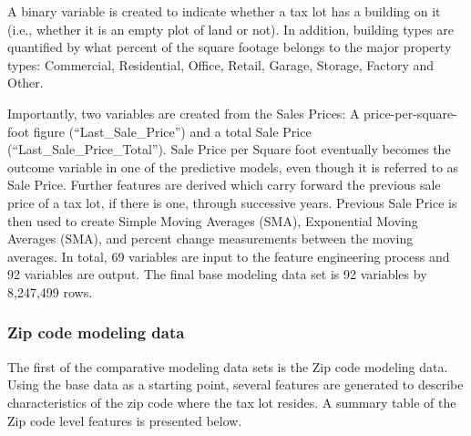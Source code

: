 \documentclass[]{article}
\begin{document}
A binary variable is created to indicate whether a tax lot has a
building on it (i.e., whether it is an empty plot of land or not). In
addition, building types are quantified by what percent of the square
footage belongs to the major property types: Commercial, Residential,
Office, Retail, Garage, Storage, Factory and Other.

Importantly, two variables are created from the Sales Prices: A
price-per-square-foot figure (``Last\_Sale\_Price'') and a total Sale
Price (``Last\_Sale\_Price\_Total''). Sale Price per Square foot
eventually becomes the outcome variable in one of the predictive models,
even though it is referred to as Sale Price. Further features are
derived which carry forward the previous sale price of a tax lot, if
there is one, through successive years. Previous Sale Price is then used
to create Simple Moving Averages (SMA), Exponential Moving Averages
(SMA), and percent change measurements between the moving averages. In
total, 69 variables are input to the feature engineering process and 92
variables are output. The final base modeling data set is 92 variables
by 8,247,499 rows.

\subsubsection{Zip code modeling data}\label{zip-code-modeling-data}

The first of the comparative modeling data sets is the Zip code modeling
data. Using the base data as a starting point, several features are
generated to describe characteristics of the zip code where the tax lot
resides. A summary table of the Zip code level features is presented
below.
\end{document}
